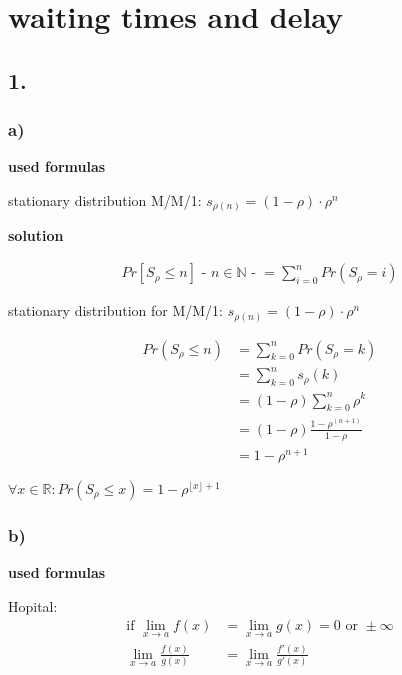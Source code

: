 \section{waiting times and delay}

\subsection*{ 1. }

\subsubsection*{ a) }

\textbf{used formulas}

stationary distribution M/M/1: $s_{{\rho \left(n\right)}}=\left(1-\rho \right)\cdot \rho ^{n}$

\textbf{solution}

\begin{align*}
Pr\left[S_{{\rho }}\le n\right] \text{ - $n \in \mathbb{N}$ - }
=\sum _{{i=0}}^{n}Pr\left(S_{{\rho }}=i\right)
\end{align*}

stationary distribution for M/M/1:
$s_{{\rho \left(n\right)}}=\left(1-\rho \right)\cdot \rho ^{n}$

\begin{align*}
Pr\left(S_{\rho }\le n\right)&=\sum _{{k=0}}^{n}Pr\left(S_{\rho }=k\right)\\
&=\sum _{{k=0}}^{n} s_{\rho }(k)\\
&=\left(1-\rho \right)\sum _{{k=0}}^{n}\rho ^{k}\\
&=\left(1-\rho \right)\frac{1-\rho ^{\left(n+1\right)}}{1-\rho }\\
&=1-\rho ^{{n+1}}
\end{align*}

$\forall x \in \mathbb{R}:Pr\left(S_{\rho }\le x\right)=1-\rho ^{{\lfloor x\rfloor+1}}$

\subsubsection*{ b) }

\textbf{used formulas}

Hopital:
\begin{align*}
\text{if } \lim _{{x\rightarrow a}}f\left(x\right)&=\lim _{{x\rightarrow a}}g\left(x\right)=0 \text{ or } \pm\infty \\
\lim _{{x\rightarrow a}}\frac{f\left(x\right)}{g\left(x\right)}&=\lim _{{x\rightarrow a}}\frac{f' \left(x\right)}{g' \left(x\right)}
\end{align*}

